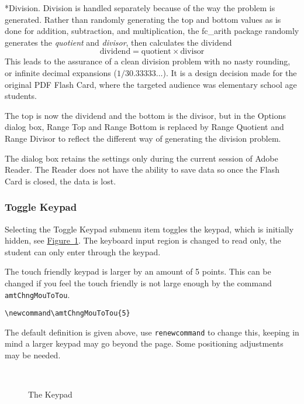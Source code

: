 \documentclass{article}
\makeatletter
\let\uif\textsf
\newcommand{\prodName}{\textsf{PDF Flash Card}}
\newcommand{\sprodName}{\textsf{Flash Card}}
\let\bslash=\@backslashchar
\renewcommand{\paragraph}{\@startsection{paragraph}{4}{0pt}{6pt}{-3pt}{\bfseries}}
\def\cs#1{\texttt{\bslash#1}}
\makeatother
\begin{document}
\paragraph*{Division.} Division is handled separately because of the way the
problem is generated. Rather than randomly generating the top and bottom
values as is done for addition, subtraction, and multiplication, the
\textsf{fc\_arith} package randomly generates the \emph{quotient} and
\emph{divisor}, then calculates the dividend
\begin{equation*}
    \text{dividend}=\text{quotient}\times\text{divisor}
\end{equation*}
This leads to the assurance of a clean division problem with no nasty
rounding, or infinite decimal expansions ($ 1/3 0.33333\dots $). It is a
design decision made for the original \prodName, where the targeted audience was
elementary school age students.

The top is now the dividend and the bottom is the divisor, but in the
\uif{Options} dialog box, \uif{Range Top} and
\uif{Range Bottom} is replaced by \uif{Range
Quotient} and \uif{Range Divisor} to reflect the different way
of generating the division problem.

\redpoint The dialog box retains the settings only during the current session
of Adobe Reader. The Reader does not have the ability to save data so once
the {\sprodName} is closed, the data is lost.

\subsubsection{Toggle Keypad}\label{toggleKp}

Selecting the \uif{Toggle Keypad} submenu item toggles the
keypad, which is initially hidden, see
\hyperref[menuKeypad]{Figure~\ref*{menuKeypad}}. The keyboard input region is
changed to read only, the student can only enter through the keypad.

The touch friendly keypad is larger by an amount of 5 points. This can be changed
if you feel the touch friendly is not large enough by the command \cs{amtChngMouToTou}.
\begin{Verbatim}[xleftmargin=\amtIndent]
\newcommand\amtChngMouToTou{5}
\end{Verbatim}
The default definition is given above, use \cs{renewcommand} to change this,
keeping in mind a larger keypad may go beyond the page. Some positioning
adjustments may be needed.

\begin{figure}[htb]
\begin{center}\setlength{\fboxsep}{0pt}
\\
\caption{The \texorpdfstring{\protect\uif{Keypad}}{Keypad}}\label{menuKeypad}
\end{center}
\end{figure}
\end{document}
